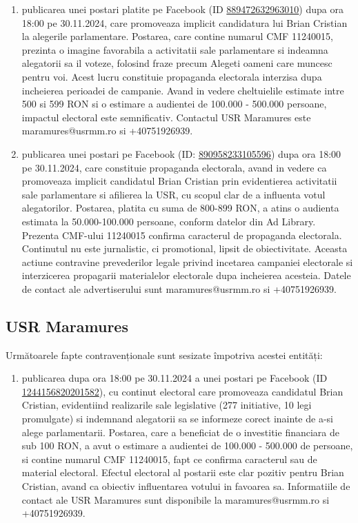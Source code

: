\documentclass[a4paper,12pt]{article}
\begin{document}
\begin{enumerate}[leftmargin=*, label=\arabic*.)]
    \item publicarea unei postari platite pe Facebook (ID \href{https://www.facebook.com/ads/library/?id=889472632963010}{889472632963010}) dupa ora 18:00 pe 30.11.2024, care promoveaza implicit candidatura lui Brian Cristian la alegerile parlamentare. Postarea, care contine numarul CMF 11240015, prezinta o imagine favorabila a activitatii sale parlamentare si indeamna alegatorii sa il voteze, folosind fraze precum Alegeti oameni care muncesc pentru voi.  Acest lucru constituie propaganda electorala interzisa dupa incheierea perioadei de campanie.  Avand in vedere cheltuielile estimate intre 500 si 599 RON si o estimare a audientei de 100.000 - 500.000 persoane, impactul electoral este semnificativ.  Contactul USR Maramures este maramures@usrmm.ro si +40751926939.
    \item publicarea unei postari pe Facebook (ID: \href{https://www.facebook.com/ads/library/?id=890958233105596}{890958233105596}) dupa ora 18:00 pe 30.11.2024, care constituie propaganda electorala, avand in vedere ca promoveaza implicit candidatul Brian Cristian prin evidentierea activitatii sale parlamentare si afilierea la USR, cu scopul clar de a influenta votul alegatorilor. Postarea, platita cu suma de 800-899 RON, a atins o audienta estimata la 50.000-100.000 persoane, conform datelor din Ad Library.  Prezenta CMF-ului 11240015 confirma caracterul de propaganda electorala.  Continutul nu este jurnalistic, ci promotional, lipsit de obiectivitate.  Aceasta actiune contravine prevederilor legale privind incetarea campaniei electorale si interzicerea propagarii materialelor electorale dupa incheierea acesteia.  Datele de contact ale advertiserului sunt maramures@usrmm.ro si +40751926939.
\end{enumerate}

\vspace{0.5cm}

\subsection{USR Maramures}
Următoarele fapte contravenționale sunt sesizate împotriva acestei entități:

\begin{enumerate}[leftmargin=*, label=\arabic*.)]
    \item publicarea dupa ora 18:00 pe 30.11.2024 a unei postari pe Facebook (ID \href{https://www.facebook.com/ads/library/?id=1244156820201582}{1244156820201582}), cu continut electoral care promoveaza candidatul Brian Cristian, evidentiind realizarile sale legislative (277 initiative, 10 legi promulgate) si indemnand alegatorii sa se informeze corect inainte de a-si alege parlamentarii.  Postarea, care a beneficiat de o investitie financiara de sub 100 RON, a avut o estimare a audientei de 100.000 - 500.000 de persoane,  si contine numarul CMF 11240015, fapt ce confirma caracterul sau de material electoral.  Efectul electoral al postarii este clar pozitiv pentru Brian Cristian, avand ca obiectiv influentarea votului in favoarea sa.  Informatiile de contact ale USR Maramures sunt disponibile la maramures@usrmm.ro si +40751926939.
\end{enumerate}
\end{document}
